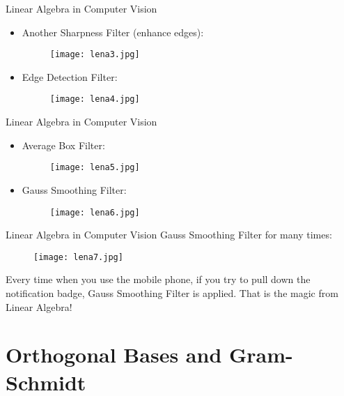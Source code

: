 \documentclass{beamer}
\begin{document}
\begin{frame}{Linear Algebra in Computer Vision}
    \begin{itemize}
        \item Another Sharpness Filter (enhance edges):
        \begin{figure}
            \centering
            \texttt{[image: lena3.jpg]}
        \end{figure}
        \item Edge Detection Filter:
        \begin{figure}
            \centering
            \texttt{[image: lena4.jpg]}
        \end{figure}
    \end{itemize}
\end{frame}

\begin{frame}{Linear Algebra in Computer Vision}
    \begin{itemize}
        \item Average Box Filter:
        \begin{figure}
            \centering
            \texttt{[image: lena5.jpg]}
        \end{figure}
        \item Gauss Smoothing Filter:
        \begin{figure}
            \centering
            \texttt{[image: lena6.jpg]}
        \end{figure}
    \end{itemize}
\end{frame}

\begin{frame}{Linear Algebra in Computer Vision}
Gauss Smoothing Filter for many times:
        \begin{figure}
            \centering
            \texttt{[image: lena7.jpg]}
        \end{figure}
        Every time when you use the mobile phone, if you try to pull down the notification badge, Gauss Smoothing Filter is applied. That is the magic from Linear Algebra!
\end{frame}

\section{Orthogonal Bases and Gram-Schmidt}
\end{document}
